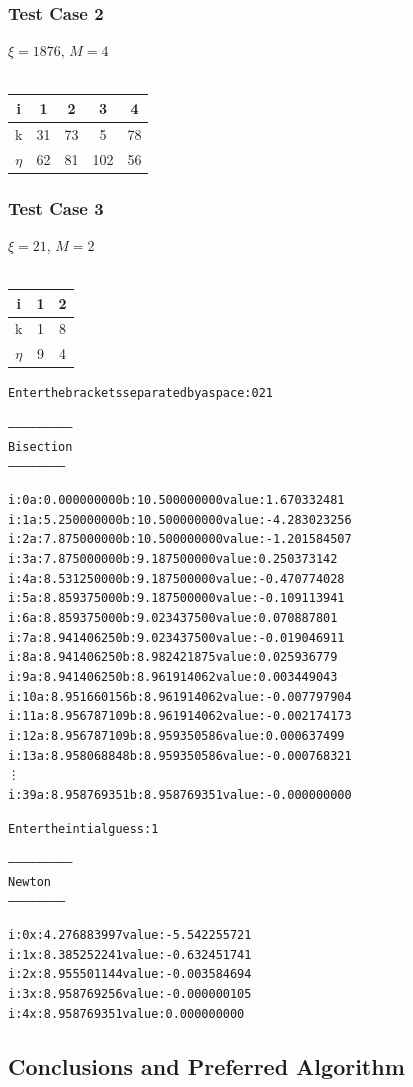 \documentclass[11pt]{article} %
\begin{document}
\subsubsection*{Test Case 2}
$\xi = 1876$, $M = 4$ \\ \\
\begin{tabular}{||c||c c c c|}
\hline
i & 1 & 2 & 3 & 4 \\
\hline
k & 31 & 73 & 5 & 78 \\
\hline
$\eta$ & 62 & 81 & 102 & 56 \\
\hline
\end{tabular}

\begin{alltt}

\end{alltt}

\subsubsection*{Test Case 3}
$\xi = 21$, $M = 2$ \\ \\
\begin{tabular}{||c||c c |}
\hline
i & 1 & 2  \\
\hline
k & 1 & 8 \\
\hline
$\eta$ & 9 & 4 \\
\hline
\end{tabular}

\begin{alltt}
Enter the brackets separated by a space: 0 21

--------------------------
 Bisection
 -----------------------


i: 0	a: 0.000000000	b: 10.500000000	value: 1.670332481 
i: 1	a: 5.250000000	b: 10.500000000	value: -4.283023256 
i: 2	a: 7.875000000	b: 10.500000000	value: -1.201584507 
i: 3	a: 7.875000000	b: 9.187500000	value: 0.250373142 
i: 4	a: 8.531250000	b: 9.187500000	value: -0.470774028 
i: 5	a: 8.859375000	b: 9.187500000	value: -0.109113941 
i: 6	a: 8.859375000	b: 9.023437500	value: 0.070887801 
i: 7	a: 8.941406250	b: 9.023437500	value: -0.019046911 
i: 8	a: 8.941406250	b: 8.982421875	value: 0.025936779 
i: 9	a: 8.941406250	b: 8.961914062	value: 0.003449043 
i: 10	a: 8.951660156	b: 8.961914062	value: -0.007797904 
i: 11	a: 8.956787109	b: 8.961914062	value: -0.002174173 
i: 12	a: 8.956787109	b: 8.959350586	value: 0.000637499 
i: 13	a: 8.958068848	b: 8.959350586	value: -0.000768321 
\vdots
i: 39	a: 8.958769351	b: 8.958769351	value: -0.000000000 

Enter the intial guess: 1

--------------------------
 Newton
 -----------------------


i: 0	x: 4.276883997	value: -5.542255721
i: 1	x: 8.385252241	value: -0.632451741
i: 2	x: 8.955501144	value: -0.003584694
i: 3	x: 8.958769256	value: -0.000000105
i: 4	x: 8.958769351	value: 0.000000000
\end{alltt}

\subsection*{Conclusions and Preferred Algorithm}
 
\end{document}
